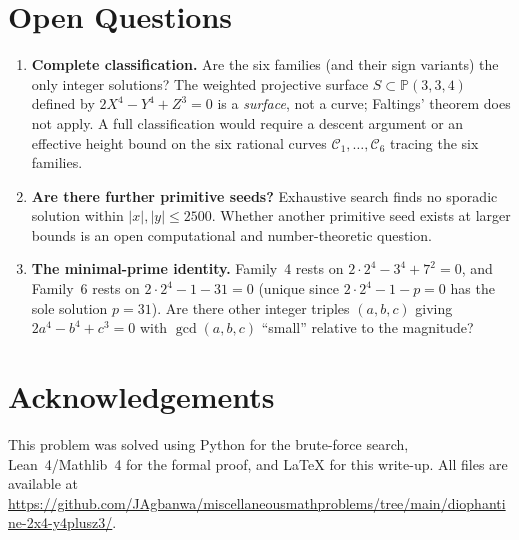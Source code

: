 \documentclass[12pt,a4paper]{article}
\theoremstyle{definition}
\begin{document}
\section{Open Questions}\label{sec:open}

\begin{enumerate}
  \item \textbf{Complete classification.}  Are the six families (and their sign variants)
    the only integer solutions?  The weighted projective surface
    $S \subset \mathbb{P}(3,3,4)$ defined by $2X^4 - Y^4 + Z^3 = 0$ is a \emph{surface},
    not a curve; Faltings' theorem does not apply.  A full classification would require
    a descent argument or an effective height bound on the six rational curves
    $\mathcal{C}_1, \ldots, \mathcal{C}_6$ tracing the six families.
  \item \textbf{Are there further primitive seeds?}  Exhaustive search finds no sporadic
    solution within $|x|, |y| \le 2500$.  Whether another primitive seed exists at
    larger bounds is an open computational and number-theoretic question.
  \item \textbf{The minimal-prime identity.}  Family~4 rests on $2\cdot 2^4 - 3^4 + 7^2 = 0$,
    and Family~6 rests on $2\cdot 2^4 - 1 - 31 = 0$ (unique since $2\cdot 2^4 - 1 - p = 0$
    has the sole solution $p = 31$).  Are there other integer triples $(a, b, c)$ giving
    $2a^4 - b^4 + c^3 = 0$ with $\gcd(a,b,c)$ ``small'' relative to the magnitude?
\end{enumerate}

\section*{Acknowledgements}

This problem was solved using Python for the brute-force search, Lean~4/Mathlib~4
for the formal proof, and \LaTeX{} for this write-up.  All files are available at
\url{https://github.com/JAgbanwa/miscellaneousmathproblems/tree/main/diophantine-2x4-y4plusz3/}.
\end{document}
